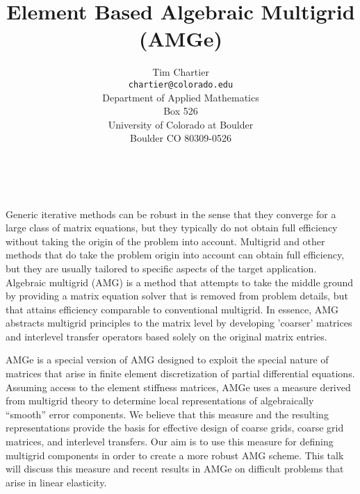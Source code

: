 \documentclass[11pt]{article}
\date{ ~ \hspace{-4mm}}
\title{Element Based Algebraic Multigrid (AMGe)  }
\author{Tim Chartier \\ {\tt chartier@colorado.edu} \\ Department of Applied Mathematics  \\  Box 526  \\  University of Colorado at Boulder  \\  Boulder   CO   80309-0526}
\begin{document}
\maketitle
\thispagestyle{empty}





 



Generic iterative methods can be robust in the sense that they converge
for a large class of matrix equations, but they typically do not obtain
full efficiency without taking the origin of the problem into account.
Multigrid and other methods that do take the problem origin into account
can obtain full efficiency, but they are usually tailored to specific
aspects of the target application. Algebraic multigrid (AMG) is a method
that attempts to take the middle ground by providing a matrix equation
solver that is removed from problem details, but that attains efficiency
comparable to conventional multigrid. In essence, AMG abstracts multigrid
principles to the matrix level by developing 'coarser' matrices and
interlevel transfer operators based solely on the original matrix
entries.



AMGe is a special version of AMG designed to exploit the special nature
of matrices that arise in finite element discretization of partial differential
equations. Assuming access to the element stiffness matrices, AMGe uses
a measure derived from multigrid theory to determine local representations
of algebraically ``smooth'' error components. We believe that this measure
and the resulting representations provide the basis for effective design of
coarse grids, coarse grid matrices, and interlevel transfers.  Our aim is to
use this measure for defining multigrid components in order to create a
more robust AMG scheme.  This talk will discuss this measure and recent
results in AMGe on difficult problems that arise in linear elasticity.
\end{document}

